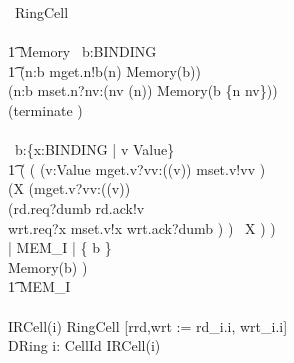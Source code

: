 \documentclass{llncs}
\begin{document}
\begin{circus}
    \circprocess\ RingCell \circdef \\
    \circbegin\\
    \t1
        Memory \circdef
                \circvres\ b:BINDING \circspot \\
            \t1 (\Extchoice n:\dom b \circspot mget.n!b(n) \then Memory(b)) \\
                \extchoice (\Extchoice n:\dom b 
                \circspot mset.n?nv:(nv \in \delta(n)) 
                \then Memory(b \oplus \{n \mapsto nv\}))\\
                \extchoice (terminate \then \Skip) \\
                    \\
        \circspot
                \circvar\ b:\{x:BINDING | v \in Value\} \circspot \\
            \t1
            (
                (
                    (\Intchoice v:Value \circspot mget.v?vv:(\delta(v)) \then mset.v!vv \then \Skip) \circseq\\
                    (\circmu X 
                     \circspot (mget.v?vv:(\delta(v)) \then \\
                                (rd.req?dumb \then rd.ack!v \then \Skip \\
                                    \extchoice wrt.req?x \then mset.v!x \then wrt.ack?dumb \then \Skip )
                            ) \circseq\ X )
                ) \\
                \lpar \emptyset | MEM_I | \{ b \} \rpar \\
                Memory(b)
            ) \\
            \t1 \hide MEM_I
        \\
    \circend
    \\
    \circusprocess IRCell(i) \circdef RingCell [rrd,wrt := rd\_i.i, wrt\_i.i]
    \\
    \circusprocess DRing \circdef \Interleave i: CellId \circspot IRCell(i)
\end{circus}%
\end{document}
